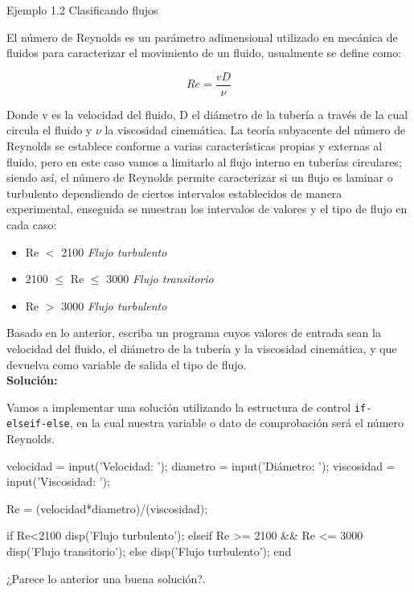 \begin{ejemplo}{Ejemplo 1.2 Clasificando flujos}

El número de Reynolds es un parámetro adimensional utilizado en
mecánica de fluidos para caracterizar el movimiento de un fluido,
usualmente se define como:

$$ Re=\frac{vD}{\nu} $$

Donde v es la velocidad del fluido, D el diámetro de la tubería a
través de la cual circula el fluido y $\nu$ la viscosidad cinemática.
La teoría subyacente del número de Reynolds se establece conforme a
varias características propias y externas al fluido, pero en este caso
vamos a limitarlo al flujo interno en tuberías circulares; siendo así,
el número de Reynolds permite caracterizar si un flujo es laminar o
turbulento dependiendo de ciertos intervalos establecidos de manera
experimental, enseguida se muestran los intervalos de valores y el
tipo de flujo en cada caso:

\begin{itemize}
\item Re $<$ 2100  \textit{Flujo turbulento}
\item 2100 $\leq$ Re $\leq$ 3000   \textit{Flujo transitorio}
\item Re $>$ 3000   \textit{Flujo turbulento}
\end{itemize}

Basado en lo anterior, escriba un programa cuyos valores de entrada
sean la velocidad del fluido, el diámetro de la tubería y la
viscosidad cinemática, y que devuelva como variable de salida el tipo
de flujo.\\

\textbf{Solución:}

Vamos a implementar una solución utilizando la estructura de control 
\texttt{if-elseif-else}, en la cual nuestra variable o dato de comprobación 
será el número Reynolds.

\begin{matlab}
velocidad = input('Velocidad: ');
diametro = input('Diámetro: ');
viscosidad = input('Viscosidad: ');

Re = (velocidad*diametro)/(viscosidad);

if Re<2100
   disp('Flujo turbulento');
elseif Re >= 2100 && Re <= 3000
   disp('Flujo transitorio');
else
   disp('Flujo turbulento');
end
\end{matlab}

¿Parece lo anterior una buena solución?.\\


\end{ejemplo}
